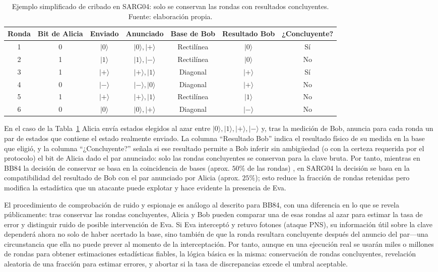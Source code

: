 \begin{table}[h]
\centering
\small
\begin{tabular}{c c c c c c c}
\hline\hline
Ronda & Bit de Alicia & Enviado & Anunciado & Base de Bob & Resultado Bob & ¿Concluyente? \\
\hline
1 & 0 & $|0\rangle$ & ${|0\rangle,|+\rangle}$ & Rectilínea & $|0\rangle$ & Sí \\
2 & 1 & $|1\rangle$ & ${|1\rangle,|-\rangle}$ & Rectilínea & $|0\rangle$ & No \\
3 & 1 & $|+\rangle$ & ${|+\rangle,|1\rangle}$ & Diagonal & $|+\rangle$ & Sí \\
4 & 0 & $|-\rangle$ & ${|-\rangle,|0\rangle}$ & Diagonal & $|+\rangle$ & No \\
5 & 1 & $|+\rangle$ & ${|+\rangle,|1\rangle}$ & Rectilínea & $|1\rangle$ & No \\
6 & 0 & $|0\rangle$ & ${|0\rangle,|+\rangle}$ & Diagonal & $|-\rangle$ & No \\
\hline
\end{tabular}
\caption[Ejemplo de cribado en SARG04]{Ejemplo simplificado de cribado en SARG04: solo se conservan las rondas con resultados concluyentes. Fuente: elaboración propia.}
\label{tab:sarg04_ejemplo}
\end{table}

En el caso de la Tabla~\ref{tab:sarg04_ejemplo} Alicia envía estados elegidos al azar entre $|0\rangle,|1\rangle,|+\rangle,|-\rangle$ y, tras la medición de Bob, anuncia para cada ronda un par de estados que contiene el estado realmente enviado. La columna “Resultado Bob” indica el resultado físico de su medida en la base que eligió, y la columna “¿Concluyente?” señala si ese resultado permite a Bob inferir sin ambigüedad (o con la certeza requerida por el protocolo) el bit de Alicia dado el par anunciado: solo las rondas concluyentes se conservan para la clave bruta. Por tanto, mientras en BB84 la decisión de conservar se basa en la coincidencia de bases (aprox. $50\%$ de las rondas) , en SARG04 la decisión se basa en la compatibilidad del resultado de Bob con el par anunciado por Alicia (aprox. $25\%$); esto reduce la fracción de rondas retenidas pero modifica la estadística que un atacante puede explotar y hace evidente la presencia de Eva. 
\newline

El procedimiento de comprobación de ruido y espionaje es análogo al descrito para BB84, con una diferencia en lo que se revela públicamente: tras conservar las rondas concluyentes, Alicia y Bob pueden comparar una de esas rondas al azar para estimar la tasa de error y distinguir ruido de posible intervención de Eva. Si Eva interceptó y retuvo fotones (ataque PNS), su información útil sobre la clave dependerá ahora no solo de haber acertado la base, sino también de que la ronda resultara concluyente después del anuncio del par—una circunstancia que ella no puede prever al momento de la interceptación. Por tanto, aunque en una ejecución real se usarán miles o millones de rondas para obtener estimaciones estadísticas fiables, la lógica básica es la misma: conservación de rondas concluyentes, revelación aleatoria de una fracción para estimar errores, y abortar si la tasa de discrepancias excede el umbral aceptable.